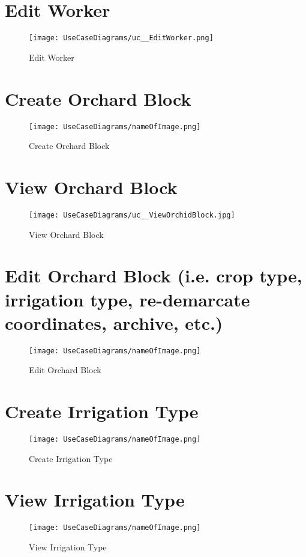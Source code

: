 \documentclass[11pt,fleqn]{book} %
\begin{document}
	\section{Edit Worker}
	\begin{figure}
		\texttt{[image: UseCaseDiagrams/uc\_\_EditWorker.png]}
		\caption{Edit Worker}
	\end{figure}

	\section{Create Orchard Block}
	\begin{figure}
		\texttt{[image: UseCaseDiagrams/nameOfImage.png]}
		\caption{Create Orchard Block}
	\end{figure}
	
	\section{View Orchard Block}
	\begin{figure}
		\texttt{[image: UseCaseDiagrams/uc\_\_ViewOrchidBlock.jpg]}
		\caption{View Orchard Block}
	\end{figure}
	
	\clearpage
	\section{Edit Orchard Block (i.e. crop type, irrigation type, re-demarcate coordinates, archive, etc.)}
	\begin{figure}
		\texttt{[image: UseCaseDiagrams/nameOfImage.png]}
		\caption{Edit Orchard Block}
	\end{figure}
	
	\section{Create Irrigation Type}
	\begin{figure}
		\texttt{[image: UseCaseDiagrams/nameOfImage.png]}
		\caption{Create Irrigation Type}
	\end{figure}
	
	\section{View Irrigation Type}
	\begin{figure}
		\texttt{[image: UseCaseDiagrams/nameOfImage.png]}
		\caption{View Irrigation Type}
	\end{figure}
	
\end{document}
